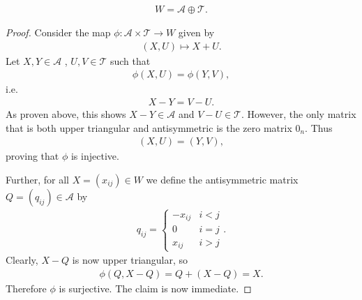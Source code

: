 \documentclass{article}
\begin{document}
\begin{claim*}[1a]
	\begin{align*}
		W=\mathcal{A}\oplus\mathcal{T}.
	\end{align*}
	\begin{proof}
		Consider the map $\phi:\mathcal{A}\times\mathcal{T}\to W$ given by
		\begin{align*}
			(X,U)\mapsto X+U.
		\end{align*}
		Let $X,Y\in\mathcal{A}$ , $U,V\in\mathcal{T}$ such that
		\begin{align*}
			\phi(X,U)=\phi(Y,V),
		\end{align*}
		i.e.
		\begin{align*}
			X-Y=V-U.
		\end{align*}
		As proven above, this shows $X-Y\in\mathcal{A}$ and $V-U\in\mathcal{T}$. However, the only matrix
		that is both upper triangular and antisymmetric is the zero matrix $0_n$.
		Thus
		\begin{align*}
			(X,U)=(Y,V),
		\end{align*}
		proving that $\phi$ is injective.

		Further, for all $X=(x_{ij})\in W$ we define the antisymmetric matrix $Q=(q_{ij})\in\mathcal{A}$
		by
		\begin{align*}
			q_{ij}=\begin{cases}
				       -x_{ij} & i<j \\
				       0       & i=j \\
				       x_{ij}  & i>j
			       \end{cases}.
		\end{align*}
		Clearly, $X-Q$ is now upper triangular, so
		\begin{align*}
			\phi(Q,X-Q)=Q+(X-Q)=X.
		\end{align*}
		Therefore $\phi$ is surjective. The claim is now immediate.
	\end{proof}
\end{claim*}
\end{document}
